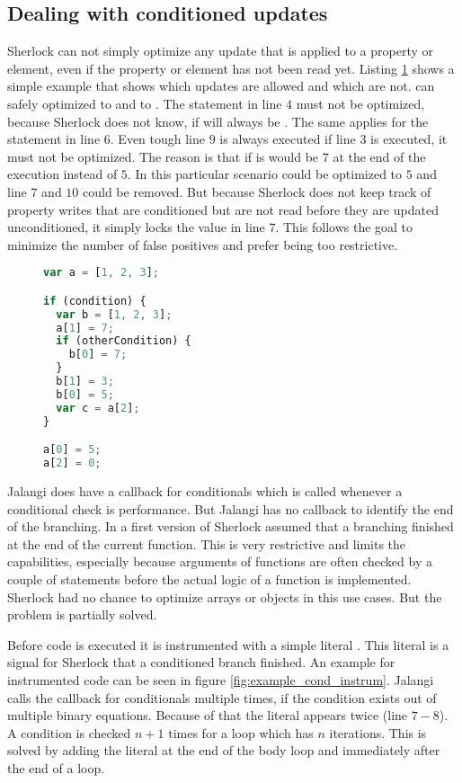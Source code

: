 \subsection{Dealing with conditioned updates}
Sherlock can not simply optimize any update that is applied to a property or element, even if the property or element has not been read yet. Listing \ref{fig:example_cond} shows a simple example that shows which updates are allowed and which are not.  can safely optimized to \js{[5, 2, 3]} and  to \js{[1, 3, 3]}. The statement in line $4$ must not be optimized, because Sherlock does not know, if  will always be . The same applies for the statement in line $6$. Even tough line $9$ is always executed if line $3$ is executed, it must not be optimized. The reason is that if  is   would be $7$ at the end of the execution instead of $5$. In this particular scenario  could be optimized to $5$ and line $7$ and $10$ could be removed. But because Sherlock does not keep track of property writes that are conditioned but are not read before they are updated unconditioned, it simply locks the value in line $7$. This follows the goal to minimize the number of false positives and prefer being too restrictive.

\begin{figure}[htbp]
\begin{lstlisting}[language=Javascript]
var a = [1, 2, 3];

if (condition) {
  var b = [1, 2, 3];
  a[1] = 7;
  if (otherCondition) {
    b[0] = 7;
  }
  b[1] = 3;
  b[0] = 5;
  var c = a[2];
}

a[0] = 5;
a[2] = 0;
\end{lstlisting}
\caption{}\label{fig:example_cond}
\end{figure}

Jalangi does have a callback for conditionals which is called whenever a conditional check is performance. But Jalangi has no callback to identify the end of the branching. In a first version of Sherlock assumed that a branching finished at the end of the current function. This is very restrictive and limits the capabilities, especially because arguments of functions are often checked by a couple of  statements before the actual logic of a function is implemented. Sherlock had no chance to optimize arrays or objects in this use cases. But the problem is partially solved. 

Before code is executed it is instrumented with a simple literal . This literal is a signal for Sherlock that a conditioned branch finished. An example for instrumented code can be seen in figure \ref{fig:example_cond_instrum}. Jalangi calls the callback for conditionals multiple times, if the condition exists out of multiple binary equations. Because of that the literal appears twice (line $7-8$). A condition is checked $n + 1$ times for a loop which has $n$ iterations. This is solved by adding the literal at the end of the body loop and immediately after the end of a loop.


